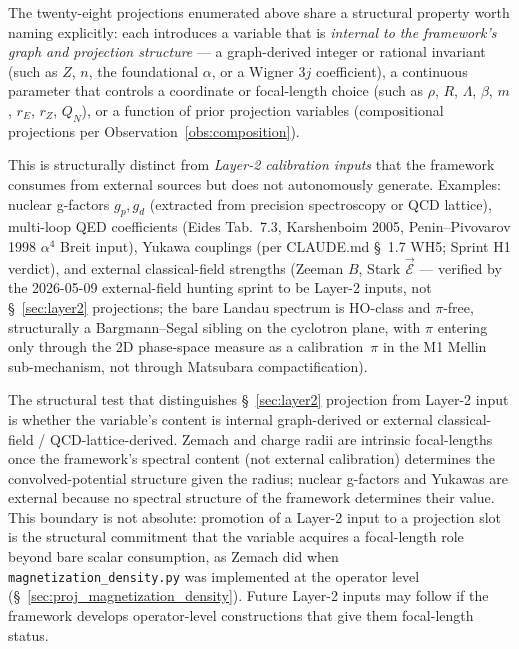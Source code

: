 \documentclass[11pt]{article}
\begin{document}
The twenty-eight projections enumerated above share a structural
property worth naming explicitly: each introduces a variable that
is \emph{internal to the framework's graph and projection structure}
--- a graph-derived integer or rational invariant (such as $Z$, $n$,
the foundational $\alpha$, or a Wigner $3j$ coefficient), a
continuous parameter that controls a coordinate or focal-length
choice (such as $\rho$, $R$, $\Lambda$, $\beta$, $m$, $r_E$, $r_Z$,
$Q_N$), or a function of prior projection variables (compositional
projections per Observation~\ref{obs:composition}).

This is structurally distinct from \emph{Layer-2 calibration inputs}
that the framework consumes from external sources but does not
autonomously generate.  Examples: nuclear g-factors $g_p, g_d$
(extracted from precision spectroscopy or QCD lattice), multi-loop
QED coefficients (Eides Tab.~7.3, Karshenboim 2005, Penin--Pivovarov
1998 $\alpha^4$ Breit input), Yukawa couplings (per CLAUDE.md
\S~1.7 WH5; Sprint H1 verdict), and external classical-field
strengths (Zeeman $B$, Stark $\vec{\mathcal{E}}$ --- verified by the
2026-05-09 external-field hunting sprint to be Layer-2 inputs, not
\S~\ref{sec:layer2} projections; the bare Landau spectrum is HO-class
and $\pi$-free, structurally a Bargmann--Segal sibling on the
cyclotron plane, with $\pi$ entering only through the 2D phase-space
measure as a calibration~$\pi$ in the M1 Mellin sub-mechanism, not
through Matsubara compactification).

The structural test that distinguishes \S~\ref{sec:layer2}
projection from Layer-2 input is whether the variable's content is
internal graph-derived or external classical-field /
QCD-lattice-derived.  Zemach and charge radii are intrinsic
focal-lengths once the framework's spectral content (not external
calibration) determines the convolved-potential structure given the
radius; nuclear g-factors and Yukawas are external because no
spectral structure of the framework determines their value.  This
boundary is not absolute: promotion of a Layer-2 input to a
projection slot is the structural commitment that the variable
acquires a focal-length role beyond bare scalar consumption, as
Zemach did when \texttt{magnetization\_density.py} was implemented
at the operator level (\S~\ref{sec:proj_magnetization_density}).
Future Layer-2 inputs may follow if the framework develops
operator-level constructions that give them focal-length status.

\end{document}
